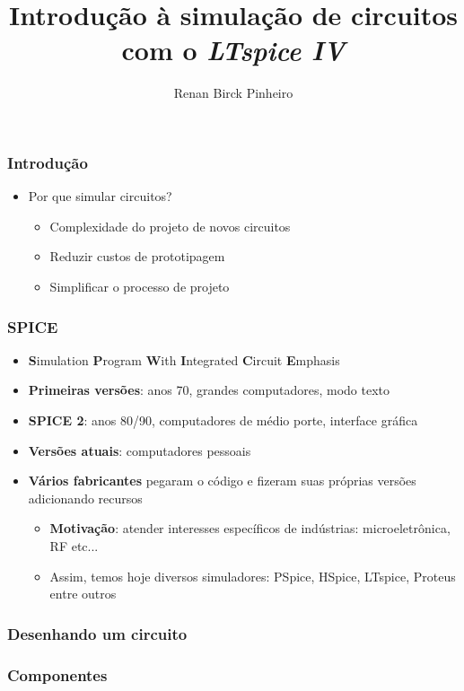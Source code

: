 \documentclass{beamer}
\title{Introdução à simulação de circuitos com o \textit{LTspice IV}}
\author{Renan Birck Pinheiro}
\institute{Universidade Federal de Santa Maria}
\begin{document}
\begin{frame}
\titlepage
\end{frame}

\begin{frame} %
\frametitle{Introdução}
\begin{itemize}
\item{Por que simular circuitos?}
\begin{itemize}
\pause
\item{Complexidade do projeto de novos circuitos}
\pause
\item{Reduzir custos de prototipagem}
\pause
\item{Simplificar o processo de projeto}
\end{itemize}
\end{itemize}
\end{frame} %

\begin{frame} %
\frametitle{SPICE}
\begin{itemize}
\item{\textbf{S}imulation \textbf{P}rogram \textbf{W}ith \textbf{I}ntegrated \textbf{C}ircuit \textbf{E}mphasis}
\item{\textbf{Primeiras versões}: anos 70, grandes computadores, modo texto}
\item{\textbf{SPICE 2}: anos 80/90, computadores de médio porte, interface gráfica}
\item{\textbf{Versões atuais}: computadores pessoais}
\pause
\item{\textbf{Vários fabricantes} pegaram o código e fizeram suas próprias versões adicionando recursos}
\begin{itemize}
\item{\textbf{Motivação}: atender interesses específicos de indústrias: microeletrônica, RF etc...}
\item{Assim, temos hoje diversos simuladores: PSpice, HSpice, LTspice, Proteus entre outros}

\end{itemize}
\end{itemize}
\end{frame} %

\begin{frame}
\frametitle{Desenhando um circuito}
\end{frame}

\begin{frame}
\frametitle{Componentes}
\end{frame}
\end{document}
